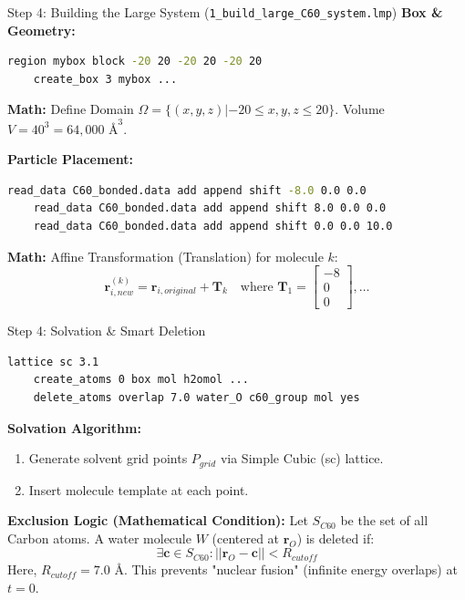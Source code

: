 \documentclass[aspectratio=169, 10pt]{beamer}
\begin{document}
\begin{frame}[fragile]{Step 4: Building the Large System (\texttt{1\_build\_large\_C60\_system.lmp})}
    \textbf{Box \& Geometry:}
    \begin{lstlisting}[language=bash]
    region mybox block -20 20 -20 20 -20 20
    create_box 3 mybox ...
    \end{lstlisting}
    \textbf{Math:} Define Domain $\Omega = \{(x,y,z) | -20 \le x,y,z \le 20\}$. Volume $V = 40^3 = 64,000 \text{ \AA}^3$.

    \vspace{0.5cm}
    \textbf{Particle Placement:}
    \begin{lstlisting}[language=bash]
    read_data C60_bonded.data add append shift -8.0 0.0 0.0
    read_data C60_bonded.data add append shift 8.0 0.0 0.0
    read_data C60_bonded.data add append shift 0.0 0.0 10.0
    \end{lstlisting}
    \textbf{Math:} Affine Transformation (Translation) for molecule $k$:
    \begin{equation}
        \mathbf{r}_{i, new}^{(k)} = \mathbf{r}_{i, original} + \mathbf{T}_k \quad \text{where } \mathbf{T}_1 = \begin{bmatrix}-8\\0\\0\end{bmatrix}, \dots
    \end{equation}
\end{frame}

\begin{frame}[fragile]{Step 4: Solvation \& Smart Deletion}
    \begin{lstlisting}[language=bash]
    lattice sc 3.1
    create_atoms 0 box mol h2omol ...
    delete_atoms overlap 7.0 water_O c60_group mol yes
    \end{lstlisting}

    \textbf{Solvation Algorithm:}
    \begin{enumerate}
        \item Generate solvent grid points $P_{grid}$ via Simple Cubic (sc) lattice.
        \item Insert molecule template at each point.
    \end{enumerate}

    \textbf{Exclusion Logic (Mathematical Condition):}
    Let $S_{C60}$ be the set of all Carbon atoms. A water molecule $W$ (centered at $\mathbf{r}_O$) is deleted if:
    \begin{equation}
        \exists \mathbf{c} \in S_{C60} : ||\mathbf{r}_O - \mathbf{c}|| < R_{cutoff}
    \end{equation}
    Here, $R_{cutoff} = 7.0$ \AA. This prevents "nuclear fusion" (infinite energy overlaps) at $t=0$.
\end{frame}
\end{document}
